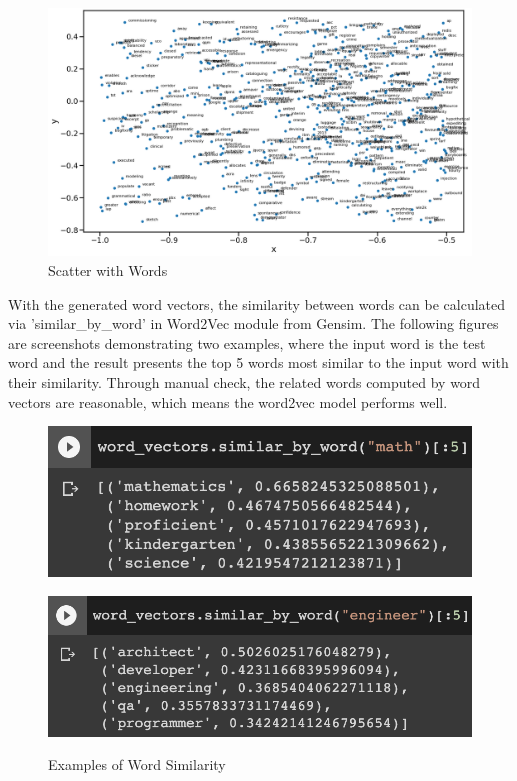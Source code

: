\begin{figure}[H]
    \centering
    \includegraphics[width=1.0\textwidth]{images/word2vec_words.png}
    \caption{Scatter with Words}
    \label{fig:28}
\end{figure}

With the generated word vectors, the similarity between words can be calculated via 'similar\_by\_word' in Word2Vec module from Gensim. The following figures are screenshots demonstrating two examples, where the input word is the test word and the result presents the top 5 words most similar to the input word with their similarity. Through manual check, the related words computed by word vectors are reasonable, which means the word2vec model performs well.


\begin{figure}[H]
    \begin{minipage}[t]{0.5\linewidth}
        \centering
        \includegraphics[scale=0.5]{images/wv_exp1.png}
        \label{fig:29}
    \end{minipage}%
    \begin{minipage}[t]{0.5\linewidth}
        \centering
        \includegraphics[scale=0.5]{images/wv_exp3.png}
        \label{fig:30}
    \end{minipage}
    \caption{Examples of Word Similarity}
\end{figure}

